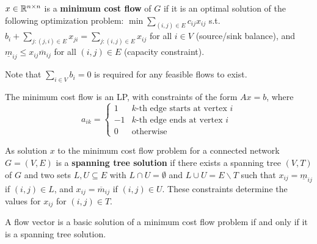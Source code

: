 \begin{defn}
  \label{sec:graphs-flows-1}
  $x \in \mathbb{R}^{n \times n}$ is a \textbf{minimum cost flow} of $G$ if it
  is an optimal solution of the following optimization problem: $\min
  \sum_{(i, j) \in E}^{} c_{ij} x_{ij}$ s.t. $b_{i} + \sum_{j: (j, i)
    \in E} x_{ji} = \sum_{j: (i, j) \in E}^{} x_{ij}$ for all $i \in
  V$ (source/sink balance), and $\underline m_{ij} \leq x_{ij}
  \overline m_{ij}$ for all $(i, j) \in E$ (capacity constraint).

  Note that $\sum_{i \in V}^{} b_{i} = 0$ is required for any feasible
  flows to exist.

  The minimum cost flow is an LP, with constraints of the form $Ax =
  b$, where
  \begin{equation}
    \label{eq:7}
    a_{ik} =
    \begin{cases}
      1 & \text{$k$-th edge starts at vertex $i$} \\
      -1 & \text{$k$-th edge ends at vertex $i$} \\
      0 & \text{otherwise}
    \end{cases}
  \end{equation}
\end{defn}

\begin{defn}
  \label{sec:graphs-flows-3}
  As solution $x$ to the minimum cost flow problem for a connected
  network $G = (V, E)$ is a \textbf{spanning tree solution} if there
  exists a spanning tree $(V, T)$ of $G$ and two sets $L, U \subseteq
  E$ with $L \cap U = \emptyset$ and $L \cup U = E \backslash T$ such
  that $x_{ij} = \underline m_{ij}$ if $(i, j) \in L$, and $x_{ij} =
  \overline m_{ij}$ if $(i, j) \in U$. These constraints determine the
  values for $x_{ij}$ for $(i, j) \in T$.
\end{defn}

\begin{thm}
  \label{sec:graphs-flows-2}
  A flow vector is a basic solution of a minimum cost flow problem if
  and only if it is a spanning tree solution.
\end{thm}

